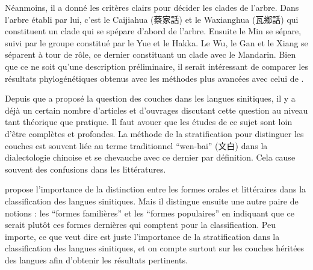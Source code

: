 \documentclass{scrbook}
\newcounter{c}[subsubsection]
\begin{document}
\begin{sloppypar}
Néanmoins, il a donné les critères clairs pour décider les clades de l'arbre. Dans l'arbre établi par lui, c'est le Caijiahua (蔡家話) et le Waxianghua (瓦鄉話) qui constituent un clade qui se spépare d'abord de l'arbre. Ensuite le Min se sépare, suivi par le groupe constitué par le Yue et le Hakka. Le Wu, le Gan et le Xiang se séparent à tour de rôle, ce dernier constituant un clade avec le Mandarin. Bien que ce ne soit qu'une description préliminaire, il serait intéressant de comparer les résultats phylogénétiques obtenus avec les méthodes plus avancées avec celui de \textcite{sagart2011classifying}. %

Depuis que \textcite{Norman1979min} a proposé la question des couches dans les langues sinitiques, il y a déjà un certain nombre d'articles et d'ouvrages discutant cette question au niveau tant théorique que pratique. Il faut avouer que les études de ce sujet sont loin d'être complètes et profondes. La méthode de la stratification pour distinguer les couches est souvent liée au terme traditionnel ``wen-bai'' (文白) dans la dialectologie chinoise et se chevauche avec ce dernier par définition. Cela cause souvent des confusions dans les littératures. 

\textcite[341]{Norman2003kejia} propose l'importance de la distinction entre les formes orales et littéraires dans la classification des langues sinitiques. Mais il distingue ensuite une autre paire de notions : les ``formes familières'' et les ``formes populaires'' en indiquant que ce serait plutôt ces formes dernières qui comptent pour la classification. Peu importe, ce que \citeauthor{Norman2003kejia} veut dire est juste l'importance de la stratification dans la classification des langues sinitiques, et on compte surtout sur les couches héritées des langues afin d'obtenir les résultats pertinents. 
 

\end{sloppypar}
\end{document}
